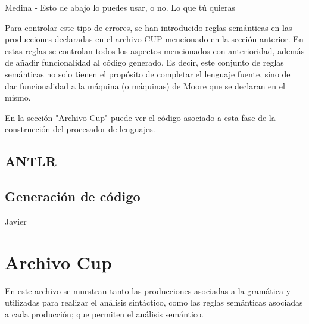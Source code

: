 \documentclass[12pt,a4paper]{article}
\begin{document}
Medina - Esto de abajo lo puedes usar, o no. Lo que tú quieras

Para controlar este tipo de errores, se han introducido reglas semánticas en las producciones declaradas en el archivo CUP mencionado en la sección anterior. En estas reglas se controlan todos los aspectos mencionados con anterioridad, además de añadir funcionalidad al código generado. Es decir, este conjunto de reglas semánticas no solo tienen el propósito de completar el lenguaje fuente, sino de dar funcionalidad a la máquina (o máquinas) de Moore que se declaran en el mismo.

En la sección "Archivo Cup" puede ver el código asociado a esta fase de la construcción del procesador de lenguajes.

\subsection{ANTLR}

\subsection{Generación de código}

Javier

\section{Archivo Cup}

En este archivo se muestran tanto las producciones asociadas a la gramática y utilizadas para realizar el análisis sintáctico, como las reglas semánticas asociadas a cada producción; que permiten el análisis semántico. 
\end{document}
